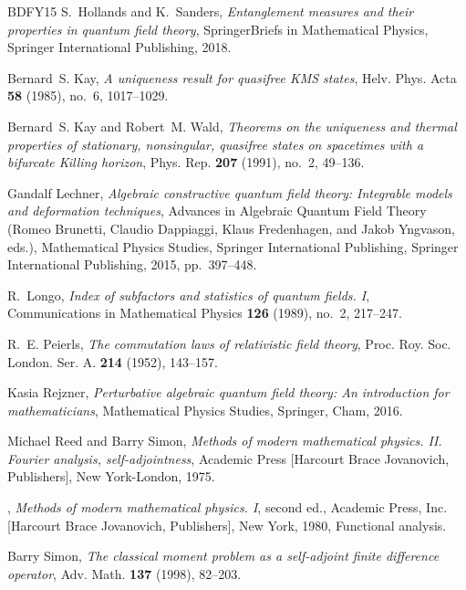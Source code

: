 \documentclass[12pt,a4paper]{article}
\newcommand{\1}{\mathds{1}}                         %
\begin{document}
{\begin{thebibliography}{BDFY15}
		S.~Hollands and K.~Sanders, \emph{Entanglement measures and their properties in
			quantum field theory}, SpringerBriefs in Mathematical Physics, Springer
		International Publishing, 2018.
		
		Bernard~S. Kay, \emph{A uniqueness result for quasifree {KMS} states}, Helv.
		Phys. Acta \textbf{58} (1985), no.~6, 1017--1029. 
		
		Bernard~S. Kay and Robert~M. Wald, \emph{Theorems on the uniqueness and thermal
			properties of stationary, nonsingular, quasifree states on spacetimes with a
			bifurcate {K}illing horizon}, Phys. Rep. \textbf{207} (1991), no.~2, 49--136.
		
		Gandalf Lechner, \emph{Algebraic constructive quantum field theory: Integrable
			models and deformation techniques}, Advances in Algebraic Quantum Field
		Theory (Romeo Brunetti, Claudio Dappiaggi, Klaus Fredenhagen, and Jakob
		Yngvason, eds.), Mathematical Physics Studies, Springer International
		Publishing, Springer International Publishing, 2015, pp.~397--448.
		
		R.~Longo, \emph{Index of subfactors and statistics of quantum fields. {I}},
		Communications in Mathematical Physics \textbf{126} (1989), no.~2, 217--247.
		
		R.~E. Peierls, \emph{The commutation laws of relativistic field theory}, Proc.
		Roy. Soc. London. Ser. A. \textbf{214} (1952), 143--157. 
		
		Kasia Rejzner, \emph{Perturbative algebraic quantum field theory: An
			introduction for mathematicians}, Mathematical Physics Studies, Springer,
		Cham, 2016. 
		
		Michael Reed and Barry Simon, \emph{Methods of modern mathematical physics.
			{II}. {F}ourier analysis, self-adjointness}, Academic Press [Harcourt Brace
		Jovanovich, Publishers], New York-London, 1975. 
		
		\bysame, \emph{Methods of modern mathematical physics. {I}}, second ed.,
		Academic Press, Inc. [Harcourt Brace Jovanovich, Publishers], New York, 1980,
		Functional analysis. 
		
		Barry Simon, \emph{The classical moment problem as a self-adjoint finite
			difference operator}, Adv. Math. \textbf{137} (1998), 82--203.
		

\end{thebibliography}}
\end{document}
